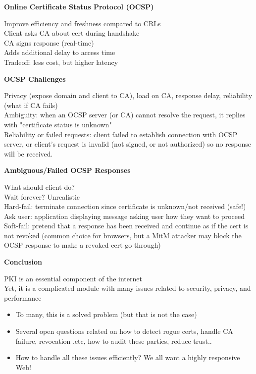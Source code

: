 \documentclass{article}
\begin{document}
\textbf{Online Certificate Status Protocol (OCSP)}

Improve efficiency and freshness compared to CRLs\\
Client asks CA about cert during handshake\\
CA signs response (real-time)\\
Adds additional delay to access time\\
Tradeoff: less cost, but higher latency

\textbf{OCSP Challenges}

Privacy (expose domain and client to CA), load on CA, response delay, reliability (what if CA fails)\\
Ambiguity: when an OCSP server (or CA) cannot resolve the request, it replies with "certificate status is unknown"\\
Reliability or failed requests: client failed to establish connection with OCSP server, or client's request is invalid (not signed, or not authorized) so no response will be received.

\textbf{Ambiguous/Failed OCSP Responses}

What should client do?\\
Wait forever? Unrealistic\\
Hard-fail: terminate connection since certificate is unknown/not received (safe!)\\
Ask user: application displaying message asking user how they want to proceed\\
Soft-fail: pretend that a response has been received and continue as if the cert is not revoked (common choice for browsers, but a MitM attacker may block the OCSP response to make a revoked cert go through)

\textbf{Conclusion}

PKI is an essential component of the internet\\
Yet, it is a complicated module with many issues related to security, privacy, and performance\begin{itemize}
	\item To many, this is a solved problem (but that is not the case)
	\item Several open questions related on how to detect rogue certs, handle CA failure, revocation ,etc, how to audit these parties, reduce trust..
	\item How to handle all these issues efficiently? We all want a highly responsive Web!
\end{itemize}
\end{document}
